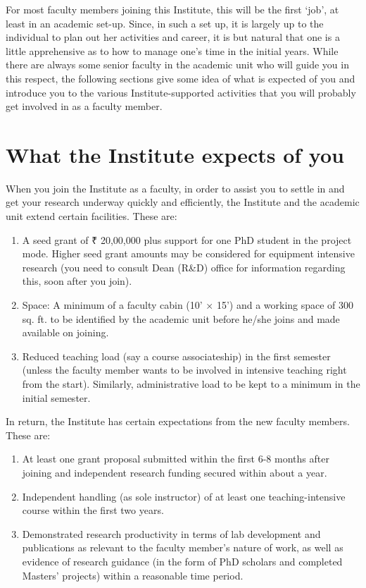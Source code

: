 \documentclass[
  10pt,
  a5paper,
  10pt,
  openany]{amsbook}
\begin{document}
For most faculty members joining this Institute, this will be the first
`job', at least in an academic set-up. Since, in such a set up, it is
largely up to the individual to plan out her activities and career, it
is but natural that one is a little apprehensive as to how to manage
one's time in the initial years. While there are always some senior
faculty in the academic unit who will guide you in this respect, the
following sections give some idea of what is expected of you and
introduce you to the various Institute-supported activities that you
will probably get involved in as a faculty member.

\section{What the Institute expects of
you}\label{what-the-institute-expects-of-you}

When you join the Institute as a faculty, in order to assist you to
settle in and get your research underway quickly and efficiently, the
Institute and the academic unit extend certain facilities. These are:

\begin{enumerate}
\def\labelenumi{\arabic{enumi}.}
\item
  A seed grant of ₹ 20,00,000 plus support for one PhD student in the
  project mode. Higher seed grant amounts may be considered for
  equipment intensive research (you need to consult Dean (R\&D) office
  for information regarding this, soon after you join).
\item
  Space: A minimum of a faculty cabin (10' × 15') and a working space of
  300 sq. ft. to be identified by the academic unit before he/she joins
  and made available on joining.
\item
  Reduced teaching load (say a course associateship) in the first
  semester (unless the faculty member wants to be involved in intensive
  teaching right from the start). Similarly, administrative load to be
  kept to a minimum in the initial semester.
\end{enumerate}

In return, the Institute has certain expectations from the new faculty
members. These are:

\begin{enumerate}
\def\labelenumi{\arabic{enumi}.}
\item
  At least one grant proposal submitted within the first 6-8 months
  after joining and independent research funding secured within about a
  year.
\item
  Independent handling (as sole instructor) of at least one
  teaching-intensive course within the first two years.
\item
  Demonstrated research productivity in terms of lab development and
  publications as relevant to the faculty member's nature of work, as
  well as evidence of research guidance (in the form of PhD scholars and
  completed Masters' projects) within a reasonable time period.
\end{enumerate}
\end{document}
